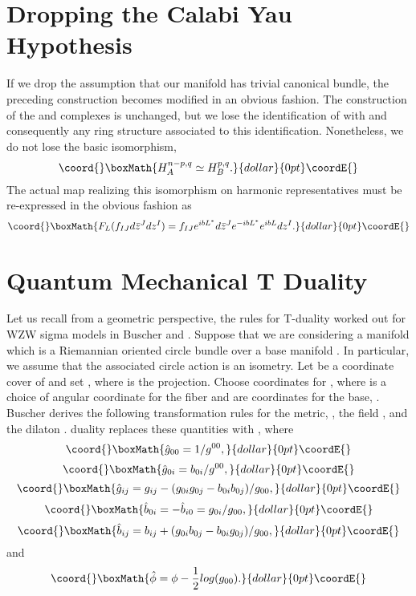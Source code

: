 \documentclass[a4paper,11pt]{amsart}
\begin{document}
\section{Dropping the Calabi Yau Hypothesis}
If we drop the assumption that our manifold has trivial canonical bundle, the
preceding construction becomes modified in an obvious fashion. The construction
of the \coordHE{} and \coordHE{} complexes is unchanged, but we lose the identification of 
\coordHE{} with \coordHE{} and consequently any ring structure associated to 
this identification. Nonetheless, we do not lose the basic isomorphism, 
$$\coord{}\boxMath{H^{n-p,q}_A \simeq H^{p,q}_B.}{dollar}{0pt}\coordE{}$$ The actual map realizing this isomorphism on 
harmonic representatives must be re-expressed in the obvious fashion as 
$$\coord{}\boxMath{F_L(f_{IJ}d\bar z^J dz^I) = f_{IJ}e^{ibL^*}d\bar z^J e^{-ibL^*} e^{ibL}dz^I.}{dollar}{0pt}\coordE{}$$

\section{Quantum Mechanical T Duality}\label{QMT}
Let us recall from a geometric perspective, the rules for 
T-duality worked out for WZW sigma models in Buscher \cite{B1} and
\cite{B2}.  
Suppose that we are considering a manifold \coordHE{} which is a Riemannian 
oriented circle bundle over a base manifold \coordHE{}. In particular, we assume 
that the associated circle action is an isometry. Let \coordHE{} be a coordinate
cover of \coordHE{} and set \coordHE{}, where \coordHE{} is the
 projection. Choose coordinates \coordHE{} for \coordHE{}, where \coordHE{} 
 is a choice of angular coordinate for the fiber and \coordHE{} are coordinates
  for the base, \coordHE{}. Buscher derives the following
transformation rules for the metric, \coordHE{}, the \coordHE{} field \coordHE{}, and the
dilaton \myHighlight{$\phi$}\coordHE{}. \coordHE{} duality replaces these quantities with 
\coordHE{}, where
$$\coord{}\boxMath{\hat g_{00} = 1/g^{00},}{dollar}{0pt}\coordE{}$$  $$\coord{}\boxMath{\hat g_{0i} = b_{0i}/g^{00},}{dollar}{0pt}\coordE{}$$ 
$$\coord{}\boxMath{\hat g_{ij} = g_{ij} - (g_{0i}g_{0j} - b_{0i}b_{0j})/g_{00},}{dollar}{0pt}\coordE{}$$  $$\coord{}\boxMath{\hat b_{0i} = -\hat b_{i0} = g_{0i}/g_{00},}{dollar}{0pt}\coordE{}$$  $$\coord{}\boxMath{\hat b_{ij} = b_{ij} + (g_{0i}b_{0j} - b_{0i}g_{0j})/g_{00},}{dollar}{0pt}\coordE{}$$
and
$$\coord{}\boxMath{\hat \phi = \phi - \frac{1}{2} log(g_{00}).}{dollar}{0pt}\coordE{}$$
\end{document}
